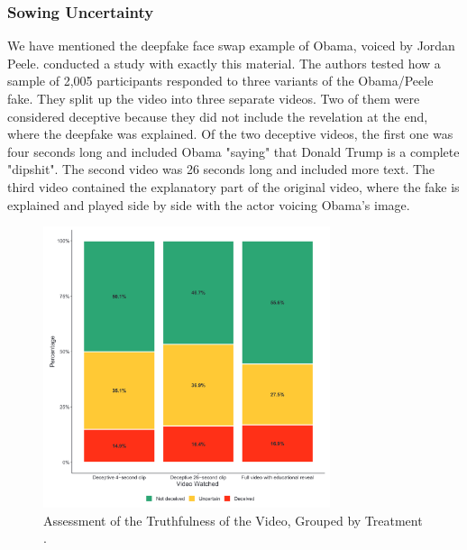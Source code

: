 \documentclass[
  a4paper,  %
  twoside,  %
  bibliography=totoc,
  headsepline,
  cleardoublepage=empty,
  parskip=half,
  draft=false
]{scrbook}
\begin{document}
\subsubsection*{Sowing Uncertainty}
We have mentioned the deepfake face swap example of Obama, voiced by Jordan Peele. \citeauthor{vaccariDeepfakesDisinformationExploring2020} conducted a study with exactly this material. The authors tested how a sample of 2,005 participants responded to three variants of the Obama/Peele fake. They split up the video into three separate videos. Two of them were considered deceptive because they did not include the revelation at the end, where the deepfake was explained. Of the two deceptive videos, the first one was four seconds long and included Obama "saying" that Donald Trump is a complete "dipshit". The second video was 26 seconds long and included more text. The third video contained the explanatory part of the original video, where the fake is explained and played side by side with the actor voicing Obama's image.

\begin{figure}[h]
  \centering
  \includegraphics[width=0.75\textwidth]{./graphics/obamafake.png}
  \caption{Assessment of the Truthfulness of the Video, Grouped by Treatment \cite{vaccariDeepfakesDisinformationExploring2020}.}
  \label{fig:obamafake-eval}
\end{figure}
\end{document}
